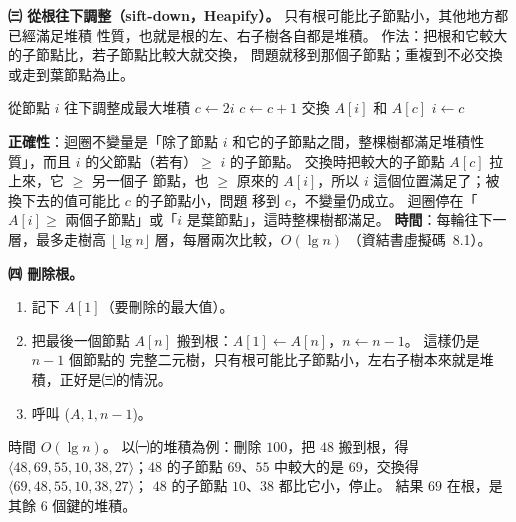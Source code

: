 \begin{pastsoln}
\textbf{㈢ 從根往下調整（sift-down，Heapify）。} 只有根可能比子節點小，其他地方都已經滿足堆積
性質，也就是根的左、右子樹各自都是堆積。 作法：把根和它較大的子節點比，若子節點比較大就交換，
問題就移到那個子節點；重複到不必交換或走到葉節點為止。
\begin{pseudo}{從節點 $i$ 往下調整成最大堆積}
 
     
        \State $c \gets 2i$ 
            \State $c \gets c + 1$ 
        \EndIf
            \State \Return {}
        \EndIf
        \State 交換 $A[i]$ 和 $A[c]$
        \State $i \gets c$ 
    \EndWhile
\EndProcedure
\end{pseudo}
\textbf{正確性}：迴圈不變量是「除了節點 $i$ 和它的子節點之間，整棵樹都滿足堆積性質」，而且
$i$ 的父節點（若有）$\ge$ $i$ 的子節點。 交換時把較大的子節點 $A[c]$ 拉上來，它 $\ge$ 另一個子
節點，也 $\ge$ 原來的 $A[i]$，所以 $i$ 這個位置滿足了；被換下去的值可能比 $c$ 的子節點小，問題
移到 $c$，不變量仍成立。 迴圈停在「$A[i] \ge$ 兩個子節點」或「$i$ 是葉節點」，這時整棵樹都滿足。
\textbf{時間}：每輪往下一層，最多走樹高 $\lfloor \lg n \rfloor$ 層，每層兩次比較，$O(\lg n)$
（資結書虛擬碼~8.1）。

\textbf{㈣ 刪除根。}
\begin{enumerate}[nosep]
\item 記下 $A[1]$（要刪除的最大值）。
\item 把最後一個節點 $A[n]$ 搬到根：$A[1] \gets A[n]$，$n \gets n - 1$。 這樣仍是 $n-1$ 個節點的
完整二元樹，只有根可能比子節點小，左右子樹本來就是堆積，正好是㈢的情況。
\item 呼叫 ($A, 1, n - 1$)。
\end{enumerate}
時間 $O(\lg n)$。 以㈠的堆積為例：刪除 $100$，把 $48$ 搬到根，得 $\langle 48, 69, 55, 10, 38, 27
\rangle$；$48$ 的子節點 $69$、$55$ 中較大的是 $69$，交換得 $\langle 69, 48, 55, 10, 38, 27 \rangle$；
$48$ 的子節點 $10$、$38$ 都比它小，停止。 結果 $69$ 在根，是其餘 $6$ 個鍵的堆積。
\end{pastsoln}
